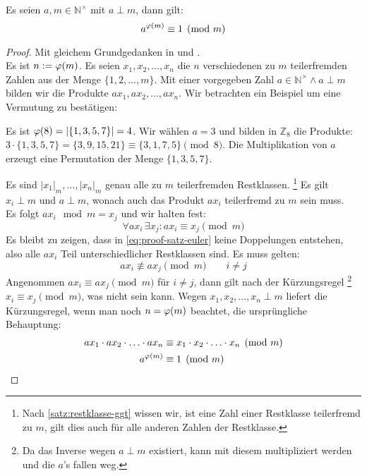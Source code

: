 \begin{satz}
  Es seien $a,m \in \mathbb{N}^\times$ mit $a \perp m$, dann gilt:
  \begin{equation*}
    a^{\varphi(m)} \equiv 1 \pmod{m}
  \end{equation*}
\end{satz}
\begin{proof}
  Mit gleichem Grundgedanken in \parencite{SITE:phi-euler-fermat} und
  \parencite[187-188]{BOOK:numberTheory}. \\
  Es ist $n := \varphi(m)$. Es seien $x_1,x_2,\ldots,x_n$ die $n$ verschiedenen zu
  $m$ teilerfremden Zahlen aus der Menge $\{1,2,\ldots,m\}$.
  Mit einer vorgegeben Zahl
  $a \in \mathbb{N}^\times \wedge a \perp m$ bilden wir die Produkte $ax_1,ax_2,\ldots,ax_n$.
  Wir betrachten ein Beispiel um eine Vermutung zu bestätigen:
  \begin{example}
    Es ist $\varphi(8) = |\{1,3,5,7\}| = 4$. Wir wählen $a = 3$ und bilden in $\mathbb{Z}_8$ die Produkte:
    $3\cdot \{1,3,5,7\} = \{3,9,15,21\} \equiv \{3,1,7,5\} \pmod{8}$. Die Multiplikation von $a$ erzeugt eine
    Permutation der Menge $\{1,3,5,7\}$.
  \end{example}
  \noindent
  Es sind $|x_1|_m,\ldots,|x_n|_m$ genau alle zu $m$ teilerfremden Restklassen.
  \footnote{
    Nach \autoref{satz:restklasse-ggt} wissen wir, ist eine Zahl einer Restklasse teilerfremd zu $m$,
    gilt dies auch für alle anderen Zahlen der Restklasse.
  }
  Es gilt $x_i \perp m$ und $a \perp m$, wonach auch das Produkt $ax_i$ teilerfremd zu $m$ sein muss.\\
  Es folgt $ax_i \mod{m} = x_j$ und wir halten fest:
  \begin{equation*}
    \label{eq:proof-satz-euler}
    \forall ax_i \, \exists x_j: ax_i \equiv x_j \pmod{m} \tag{$*$}
  \end{equation*}
  Es bleibt zu zeigen, dass in \eqref{eq:proof-satz-euler} keine Doppelungen entstehen,
  also alle $ax_i$ Teil unterschiedlicher Restklassen sind. Es muss gelten:
  \begin{equation*}
    ax_i \not\equiv ax_j \pmod{m} \qquad i \neq j
  \end{equation*}
  Angenommen $ax_i \equiv ax_j \pmod{m}$ für $i \neq j$, dann gilt nach der Kürzungsregel
  \footnote{
    Da das Inverse wegen $a \perp m$ existiert, kann mit diesem multipliziert werden und die $a$'s
    fallen weg.
  }
  $x_i \equiv x_j \pmod{m}$, was nicht sein kann.
  Wegen $x_1,x_2,\ldots,x_n \perp m$ liefert die Kürzungsregel, wenn man noch
  $n = \varphi(m)$ beachtet, die ursprüngliche Behauptung:
  \begin{align*}
    ax_1 \cdot ax_2 \cdot \ldots \cdot ax_n & \equiv
    x_1 \cdot x_2 \cdot \ldots \cdot x_n  \pmod{m}                       \\
    a^{\varphi(m)}                            & \equiv 1 \pmod{m} \qedhere
  \end{align*}
\end{proof}

